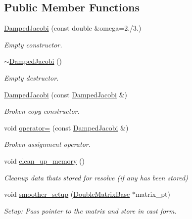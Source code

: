 \subsection*{Public Member Functions}
\begin{DoxyCompactItemize}
\item 
\hyperlink{classoomph_1_1DampedJacobi_aac608c2e9bd7a78eb8a9a2e70119fad6}{Damped\+Jacobi} (const double \&omega=2./3.)
\begin{DoxyCompactList}\small\item\em Empty constructor. \end{DoxyCompactList}\item 
\hyperlink{classoomph_1_1DampedJacobi_a0ff17366e055670b3857d4443facf4a6}{$\sim$\+Damped\+Jacobi} ()
\begin{DoxyCompactList}\small\item\em Empty destructor. \end{DoxyCompactList}\item 
\hyperlink{classoomph_1_1DampedJacobi_a8773d3bf8e32c1f6caec5b52abb2b21b}{Damped\+Jacobi} (const \hyperlink{classoomph_1_1DampedJacobi}{Damped\+Jacobi} \&)
\begin{DoxyCompactList}\small\item\em Broken copy constructor. \end{DoxyCompactList}\item 
void \hyperlink{classoomph_1_1DampedJacobi_a65d1f2f53c0ccaeda4a07e7dc7a79581}{operator=} (const \hyperlink{classoomph_1_1DampedJacobi}{Damped\+Jacobi} \&)
\begin{DoxyCompactList}\small\item\em Broken assignment operator. \end{DoxyCompactList}\item 
void \hyperlink{classoomph_1_1DampedJacobi_a959c1fcafae700e8735f7100fd3670f1}{clean\+\_\+up\+\_\+memory} ()
\begin{DoxyCompactList}\small\item\em Cleanup data that\textquotesingle{}s stored for resolve (if any has been stored) \end{DoxyCompactList}\item 
void \hyperlink{classoomph_1_1DampedJacobi_a8f136ac45998419c70708166b16a66e1}{smoother\+\_\+setup} (\hyperlink{classoomph_1_1DoubleMatrixBase}{Double\+Matrix\+Base} $\ast$matrix\+\_\+pt)
\begin{DoxyCompactList}\small\item\em Setup\+: Pass pointer to the matrix and store in cast form. \end{DoxyCompactList}\item 

\end{DoxyCompactItemize}
